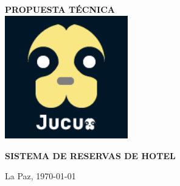 \begin{titlepage}
	\setlength{\baselineskip}{38pt}
	\pagecolor{jucuxBlue}
	\centering
	{
	{\bfseries \large PROPUESTA TÉCNICA}\\[6cm]

	\includegraphics[width=0.4\textwidth]{assets/logojucux.png}

	\textbf{\Huge \MakeUppercase{Sistema de Reservas de Hotel}}

	\vfill
	{La Paz, \today\par}
	}
\end{titlepage}
\nopagecolor